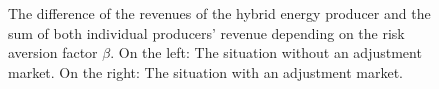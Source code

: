 \begin{figure}[h!]
	\centering
	
	\begin{minipage}{0.95\textwidth}
		\hfill
		
		\caption{The difference of the revenues of the hybrid energy producer and the sum of both individual producers' revenue depending on the risk aversion factor $\beta$. On the left: The situation without an adjustment market. On the right: The situation with an adjustment market.  }
	\end{minipage}	
\end{figure}

